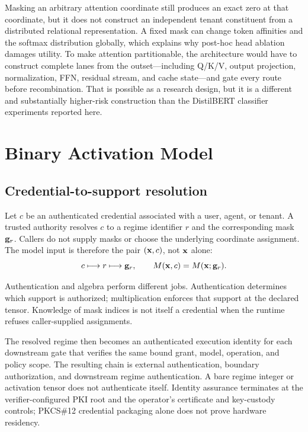 \documentclass[11pt]{article}
\begin{document}
Masking an arbitrary attention coordinate still produces an exact zero at that
coordinate, but it does not construct an independent tenant constituent from a
distributed relational representation. A fixed mask can change token
affinities and the softmax distribution globally, which explains why post-hoc
head ablation damages utility. To make attention partitionable, the architecture
would have to construct complete lanes from the outset---including Q/K/V,
output projection, normalization, FFN, residual stream, and cache state---and
gate every route before recombination. That is possible as a research design,
but it is a different and substantially higher-risk construction than the
DistilBERT classifier experiments reported here.

\section{Binary Activation Model}

\subsection{Credential-to-support resolution}

Let $c$ be an authenticated credential associated with a user, agent, or
tenant. A trusted authority resolves $c$ to a regime identifier $r$ and the
corresponding mask $\mathbf{g}_r$. Callers do not supply masks or choose the underlying
coordinate assignment. The model input is therefore the pair $(\mathbf{x},c)$, not
$\mathbf{x}$ alone:
\begin{equation}
  c\longmapsto r\longmapsto\mathbf{g}_r,
  \qquad M(\mathbf{x},c)=M(\mathbf{x};\mathbf{g}_r).
\end{equation}

Authentication and algebra perform different jobs. Authentication determines
which support is authorized; multiplication enforces that support at the
declared tensor. Knowledge of mask indices is not itself a credential when the
runtime refuses caller-supplied assignments.

The resolved regime then becomes an authenticated execution identity for each
downstream gate that verifies the same bound grant, model, operation, and policy
scope. The resulting chain is external authentication, boundary authorization,
and downstream regime authentication. A bare regime integer or activation
tensor does not authenticate itself. Identity assurance terminates at the
verifier-configured PKI root and the operator's certificate and key-custody
controls; PKCS\#12 credential packaging alone does not prove hardware residency.
\end{document}
